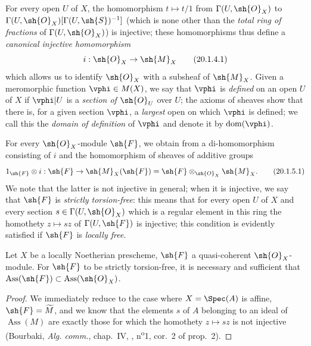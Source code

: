 \begin{env}[20.1.4]
\label{IV.20.1.4}
For every open $U$ of $X$, the homomorphism $t\mapsto t/1$ from $\Gamma(U,\sh{O}_X)$ to $\Gamma(U,\sh{O}_X)[\Gamma(U,\sh{S})^{-1}]$ (which is none other than the \emph{total ring of fractions} of
$\Gamma(U,\sh{O}_X)$) is injective;
these homomorphisms thus define a \emph{canonical injective homomorphism}
\[
\label{IV.20.1.4.1}
  i:\sh{O}_X\to\sh{M}_X
  \tag{20.1.4.1}
\]
which allows us to identify $\sh{O}_X$ with a subsheaf of $\sh{M}_X$.
Given a meromorphic function $\vphi\in M(X)$, we say that $\vphi$ is \emph{defined} on an open $U$ of $X$ if $\vphi|U$ is a \emph{section of $\sh{O}_U$} over $U$;
the axioms of sheaves show that there is, for a given section $\vphi$, a \emph{largest} open on which $\vphi$ is defined;
we call this the \emph{domain of definition} of $\vphi$ and denote it by $\operatorname{dom}(\vphi)$.
\end{env}

\begin{env}[20.1.5]
\label{IV.20.1.5}
For every $\sh{O}_X$-module $\sh{F}$, we obtain from  a di-homomorphism consisting of $i$ and the homomorphism of sheaves of additive groups
\[
\label{IV.20.1.5.1}
  1_\sh{F}\otimes i:\sh{F}\to\sh{M}_X(\sh{F})=\sh{F}\otimes_{\sh{O}_X}\sh{M}_X.
  \tag{20.1.5.1}
\]
We note that the latter is not injective in general;
when it is injective, we say that $\sh{F}$ is \emph{strictly torsion-free}:
this means that for every open $U$ of $X$ and every section $s\in\Gamma(U,\sh{O}_X)$ which is a regular element in this ring the homothety $z\mapsto sz$ of $\Gamma(U,\sh{F})$ is injective;
this condition is evidently satisfied if $\sh{F}$ is \emph{locally free}.
\end{env}

\begin{proposition}[20.1.6]
\label{IV.20.1.6}
Let $X$ be a locally Noetherian prescheme, $\sh{F}$ a quasi-coherent $\sh{O}_X$-module.
For $\sh{F}$ to be strictly torsion-free, it is necessary and sufficient that $\operatorname{Ass}(\sh{F})\subset\operatorname{Ass}(\sh{O}_X)$.
\end{proposition}
 
\begin{proof}
We immediately reduce to the case where $X=\Spec(A)$ is affine, $\sh{F}=\widetilde{M}$, and we know that the elements $s$ of $A$ belonging to an ideal of $\operatorname{Ass}(M)$ are exactly those for which the homothety $z\mapsto sz$ is not injective (Bourbaki, \emph{Alg. comm.}, chap.~IV, , n\textsuperscript{o}1, cor.~2 of prop.~2).
\end{proof}

